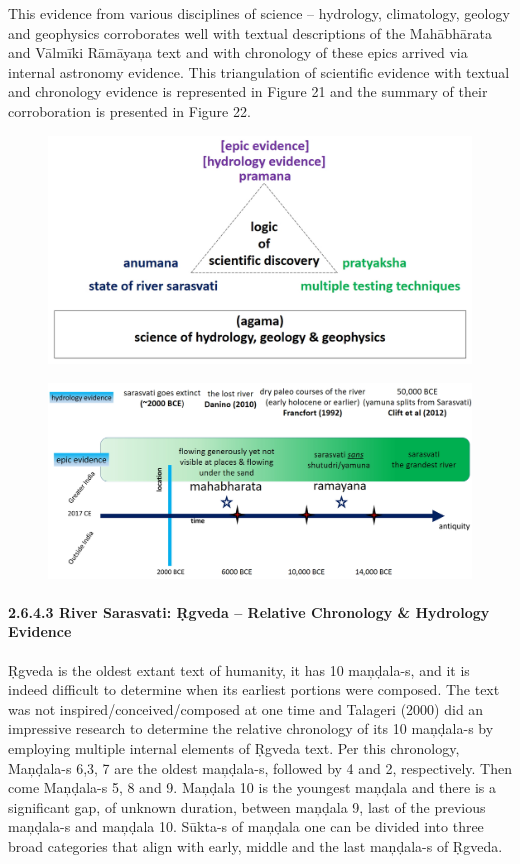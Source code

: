 This evidence from various disciplines of science – hydrology, climatology, geology and geophysics corroborates well with textual descriptions of the Mahābhārata and Vālmīki Rāmāyaņa text and with chronology of these epics arrived via internal astronomy evidence. This triangulation of scientific evidence with textual and chronology evidence is represented in Figure 21 and the summary of their corroboration is presented in Figure 22.

\begin{figure}[!htbp]
\includegraphics[scale=0.2]{"images/8-21.jpg"}
\caption{}\label{art8-fig21}
\end{figure}


\begin{figure}[!htbp]
\includegraphics[scale=0.2]{"images/8-22.jpg"}
\caption{}\label{art8-fig22}
\end{figure}


\paragraph*{2.6.4.3 River Sarasvati: Ṛgveda – Relative Chronology \& Hydrology Evidence}

Ṛgveda is the oldest extant text of humanity, it has 10 maņḍala-s, and it is indeed difficult to determine when its earliest portions were composed. The text was not inspired/conceived/composed at one time and Talageri (2000) did an impressive research to determine the relative chronology of its 10 maņḍala-s by employing multiple internal elements of Ṛgveda text. Per this chronology, Maņḍala-s 6,3, 7 are the oldest maņḍala-s, followed by 4 and 2, respectively. Then come Maņḍala-s 5, 8 and 9. Maņḍala 10 is the youngest maņḍala and there is a significant gap, of unknown duration, between maņḍala 9, last of the previous maņḍala-s and maņḍala 10. Sūkta-s of maņḍala one can be divided into three broad categories that align with early, middle and the last maņḍala-s of Ṛgveda.

